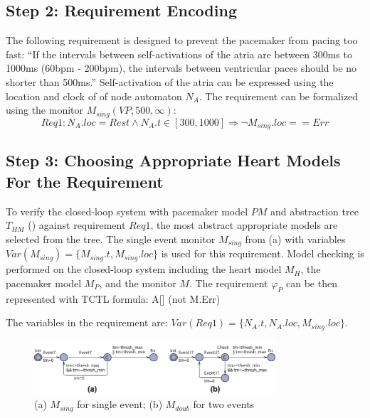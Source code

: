 \subsection*{Step 2: Requirement Encoding}
The following requirement is designed to prevent the pacemaker from pacing too fast: 
``If the intervals between self-activations of the atria are between 300ms to 1000ms (60bpm - 200bpm), the intervals between ventricular paces should be no shorter than 500ms.''
Self-activation of the atria can be expressed using the location and clock of of node automaton $N_A$.
The requirement can be formalized using the monitor  $M_{sing}(VP,500,\infty)$:
\[Req1: N_A.loc=Rest \land N_A.t\in [300,1000] \Rightarrow \neg M_{sing}.loc==Err\]
%
 \subsection*{Step 3: Choosing Appropriate Heart Models For the Requirement}
To verify the closed-loop system with pacemaker model $PM$ and abstraction tree $T_{HM}$ () against requirement $Req1$, the most abstract appropriate models are selected from the tree. 
The single event monitor $M_{sing}$ from (a) with variables $Var(M_{sing})=\{M_{sing}.t,M_{sing}.loc\}$ is used for this requirement. Model checking is performed on the closed-loop system including the heart model $M_H$, the pacemaker model $M_P$, and the monitor $M$. The requirement $\varphi_P$ can be then represented with TCTL formula:
 \textsf{A[] (not M.Err)}

The variables in the requirement are:
$Var(Req1)=\{N_A.t,N_A.loc,M_{sing}.loc\}$.
\begin{figure}[b]
		\centering
		\includegraphics[width=0.8\textwidth]{figs/monitor.pdf}
		\caption{\small (a) $M_{sing}$ for single event; (b) $M_{doub}$ for two events}
		  \vspace{-10pt}
		\label{fig:monitor}
\end{figure}

